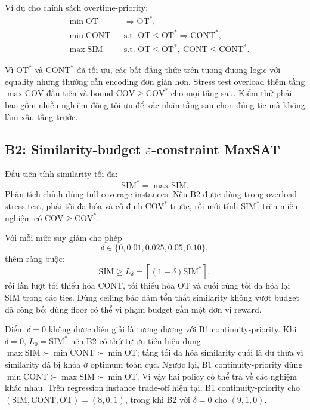 \documentclass[12pt,a4paper]{article}
\newcommand{\SIM}{\mathrm{SIM}}
\newcommand{\CONT}{\mathrm{CONT}}
\newcommand{\OT}{\mathrm{OT}}
\newcommand{\COV}{\mathrm{COV}}
\begin{document}
Ví dụ cho chính sách overtime-priority:
\begin{align*}
  &\min \OT  &&\Rightarrow \OT^*,\\
  &\min \CONT&&\text{s.t. }\OT\leq\OT^* \Rightarrow \CONT^*,\\
  &\max \SIM &&\text{s.t. }\OT\leq\OT^*,\ \CONT\leq\CONT^*.
\end{align*}

Vì $\OT^*$ và $\CONT^*$ đã tối ưu, các bất đẳng thức trên tương đương logic
với equality nhưng thường cần encoding đơn giản hơn. Stress test overload thêm
tầng $\max\COV$ đầu tiên và bound $\COV\geq\COV^*$ cho mọi tầng sau. Kiểm thử
phải bao gồm nhiều nghiệm đồng tối ưu để xác nhận tầng sau chọn đúng tie mà
không làm xấu tầng trước.

\subsection{B2: Similarity-budget
\texorpdfstring{$\varepsilon$}{epsilon}-constraint MaxSAT}

Đầu tiên tính similarity tối đa:
\begin{equation}
  \SIM^*=\max \SIM.
\end{equation}
Phân tích chính dùng full-coverage instances. Nếu B2 được dùng trong overload
stress test, phải tối đa hóa và cố định $\COV^*$ trước, rồi mới tính $\SIM^*$
trên miền nghiệm có $\COV\geq\COV^*$.

Với mỗi mức suy giảm cho phép
\begin{equation}
  \delta\in\{0,0.01,0.025,0.05,0.10\},
\end{equation}
thêm ràng buộc:
\begin{equation}
  \SIM\geq L_\delta
  =\left\lceil(1-\delta)\SIM^*\right\rceil,
  \label{eq:similarity-budget}
\end{equation}
rồi lần lượt tối thiểu hóa $\CONT$, tối thiểu hóa $\OT$ và cuối cùng tối đa hóa
lại $\SIM$ trong các ties. Dùng ceiling bảo đảm tổn thất similarity không vượt
budget đã công bố; dùng floor có thể vi phạm budget gần một đơn vị reward.

Điểm $\delta=0$ không được diễn giải là tương đương với B1
continuity-priority. Khi $\delta=0$, $L_0=\SIM^*$ nên B2 có thứ tự ưu tiên hiệu
dụng $\max\SIM\succ\min\CONT\succ\min\OT$; tầng tối đa hóa similarity cuối là
dư thừa vì similarity đã bị khóa ở optimum toàn cục. Ngược lại, B1
continuity-priority dùng
$\min\CONT\succ\max\SIM\succ\min\OT$. Vì vậy hai policy có thể trả về các
nghiệm khác nhau. Trên regression instance trade-off hiện tại, B1
continuity-priority cho $(\SIM,\CONT,\OT)=(8,0,1)$, trong khi B2 với
$\delta=0$ cho $(9,1,0)$.
\end{document}
